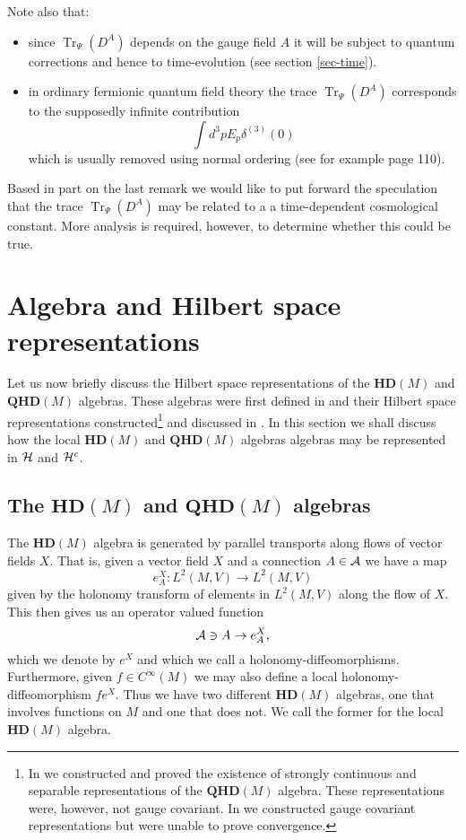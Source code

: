 \documentclass[letterpaper,11pt]{article}
\def\d{\delta}
\def\ca{{\cal A}}
\def\ch{{\cal H}}
\newcommand{\Tr}{\operatorname{Tr}}
\begin{document}
Note also that:
\begin{itemize}
\item
since $\Tr_\Psi (D^A)$ depends on the gauge field $A$ it will be subject to quantum corrections and hence to time-evolution (see section \ref{sec-time}).
\item
in ordinary fermionic quantum field theory the trace $\Tr_\Psi (D^A)$ corresponds to the supposedly infinite contribution
$$
\int d^3 p E_p \d^{(3)}(0)  
$$
 which is usually removed using normal ordering (see for example \cite{Tong} page 110). 
\end{itemize}
Based in part on the last remark we would like to put forward the speculation that the trace $\Tr_\Psi (D^A)$ may be related to a a time-dependent cosmological constant. More analysis is required, however, to determine whether this could be true.





\section{Algebra and Hilbert space representations}
\label{sechilbert}



Let us now briefly discuss the Hilbert space representations of the $\mathbf{HD}(M)$ and $\mathbf{QHD}(M)$ algebras. These algebras were first defined in \cite{Aastrup:2012vq,AGnew,Aastrup:2014ppa} and their Hilbert space representations constructed\footnote{In \cite{Aastrup:2017vrm} we constructed and proved the existence of strongly continuous and separable representations of the $\mathbf{QHD}(M)$ algebra. These representations were, however, not gauge covariant. In \cite{Aastrup:2019yui} we constructed gauge covariant representations but were unable to prove convergence.} and discussed in \cite{Aastrup:2019yui,Aastrup:2017vrm}. In this section we shall discuss how the local $\mathbf{HD}(M)$ and $\mathbf{QHD}(M)$ algebras algebras may be represented in $\ch$ and $\ch^c$.

\subsection{The $\mathbf{HD}(M)$ and $\mathbf{QHD}(M)$ algebras}

The $\mathbf{HD}(M)$ algebra is generated by parallel transports along flows of vector fields $X$. That is, given a vector field $X$ and a connection $A\in\ca$ we have a map 
$$
e^X_A : L^2(M,V)\rightarrow L^2(M,V)
$$
given by the holonomy transform of elements in $L^2(M,V)$ along the flow of $X$. This then gives us an operator valued function 
$$
\ca \ni A \rightarrow e^X_A,
$$
which we denote by $e^X$ and which we call a holonomy-diffeomorphisms.
Furthermore, given $f\in C^\infty(M)$ we may also define a local holonomy-diffeomorphism $f e^X$. Thus we have two different $\mathbf{HD}(M)$ algebras, one that involves functions on $M$ and one that does not. We call the former for the local $\mathbf{HD}(M)$ algebra.
\end{document}

